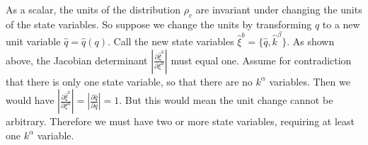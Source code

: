 \documentclass[letterpaper]{article}
\begin{document}
As a scalar, the units of the distribution $\rho_c$ are invariant under changing the units of the state variables. So suppose we change the units by transforming $q$ to a new unit variable $\hat{q}=\hat{q}(q)$. Call the new state variables $\hat{\xi}^b = \{ \hat{q}, \hat{k}^\beta\}$. As shown above, the Jacobian determinant $\left|\frac{\partial \hat{\xi}^b}{\partial \xi^a} \right|$ must equal one. Assume for contradiction that there is only one state variable, so that there are no $k^\alpha$ variables. Then we would have $\left|\frac{\partial \hat{\xi}^b}{\partial \xi^a} \right| = \left|\frac{\partial \hat q}{\partial q} \right| = 1$. But this would mean the unit change cannot be arbitrary. Therefore we must have two or more state variables, requiring at least one $k^\alpha$ variable. 

\end{document}
